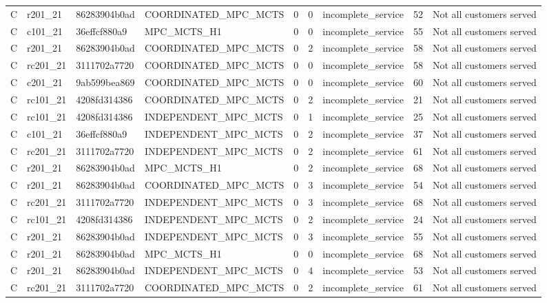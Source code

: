 \begin{table}
{\begin{tabular}{llllrrlrl}
C & r201\_21 & 86283904b0ad & COORDINATED\_MPC\_MCTS & 0 & 0 & incomplete\_service & 52 & Not all customers served \\
C & c101\_21 & 36effcf880a9 & MPC\_MCTS\_H1 & 0 & 0 & incomplete\_service & 55 & Not all customers served \\
C & r201\_21 & 86283904b0ad & COORDINATED\_MPC\_MCTS & 0 & 2 & incomplete\_service & 58 & Not all customers served \\
C & rc201\_21 & 3111702a7720 & COORDINATED\_MPC\_MCTS & 0 & 0 & incomplete\_service & 58 & Not all customers served \\
C & c201\_21 & 9ab599bea869 & COORDINATED\_MPC\_MCTS & 0 & 0 & incomplete\_service & 60 & Not all customers served \\
C & rc101\_21 & 4208fd314386 & COORDINATED\_MPC\_MCTS & 0 & 2 & incomplete\_service & 21 & Not all customers served \\
C & rc101\_21 & 4208fd314386 & INDEPENDENT\_MPC\_MCTS & 0 & 1 & incomplete\_service & 25 & Not all customers served \\
C & c101\_21 & 36effcf880a9 & INDEPENDENT\_MPC\_MCTS & 0 & 2 & incomplete\_service & 37 & Not all customers served \\
C & rc201\_21 & 3111702a7720 & INDEPENDENT\_MPC\_MCTS & 0 & 2 & incomplete\_service & 61 & Not all customers served \\
C & r201\_21 & 86283904b0ad & MPC\_MCTS\_H1 & 0 & 2 & incomplete\_service & 68 & Not all customers served \\
C & r201\_21 & 86283904b0ad & COORDINATED\_MPC\_MCTS & 0 & 3 & incomplete\_service & 54 & Not all customers served \\
C & rc201\_21 & 3111702a7720 & INDEPENDENT\_MPC\_MCTS & 0 & 3 & incomplete\_service & 68 & Not all customers served \\
C & rc101\_21 & 4208fd314386 & INDEPENDENT\_MPC\_MCTS & 0 & 2 & incomplete\_service & 24 & Not all customers served \\
C & r201\_21 & 86283904b0ad & INDEPENDENT\_MPC\_MCTS & 0 & 3 & incomplete\_service & 55 & Not all customers served \\
C & r201\_21 & 86283904b0ad & MPC\_MCTS\_H1 & 0 & 0 & incomplete\_service & 68 & Not all customers served \\
C & r201\_21 & 86283904b0ad & INDEPENDENT\_MPC\_MCTS & 0 & 4 & incomplete\_service & 53 & Not all customers served \\
C & rc201\_21 & 3111702a7720 & COORDINATED\_MPC\_MCTS & 0 & 2 & incomplete\_service & 61 & Not all customers served \\

\end{tabular}}
\end{table}
